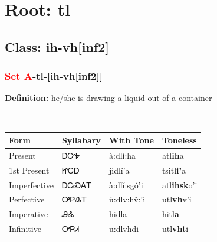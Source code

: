 \needspace{4in}
\section*{Root: tl}
\nopagebreak
{}
\needspace{3in}
\subsection*{Class: ih-vh[inf2]}
\nopagebreak
\needspace{2in}
\subsubsection*{\textcolor{Red}{Set A}{-}\textbf{tl}{-}[ih-vh[inf2]]}
\nopagebreak
\textbf{Definition: } he/she is drawing a liquid out of a container
\\[0.5em]
\begin{tabularx}{\textwidth}{l X X X}%
\toprule%
\textbf{Form}&\textbf{Syllabary}&\textbf{With Tone}&\textbf{Toneless}\\%
\midrule%
Present&ᎠᏟᎭ&à:dlǐ:ha&atl\textbf{ih}a\\%
1st Present&ᏥᏟᎠ&jidlí’a&tsitl\textbf{i'}a\\%
Imperfective&ᎠᏟᏍᎪᎢ&à:dlǐ:sgó’i&atl\textbf{ihsk}o'i\\%
Perfective&ᎤᏢᎲᎢ&ù:dlv:hv̌:’i&utl\textbf{vh}v'i\\%
Imperative&ᎯᏜ&hidla&hitl\textbf{a}\\%
Infinitive&ᎤᏢᏗ&u:dlvhdi&utl\textbf{vht}i\\%
\bottomrule%
\end{tabularx}
\\[1em]